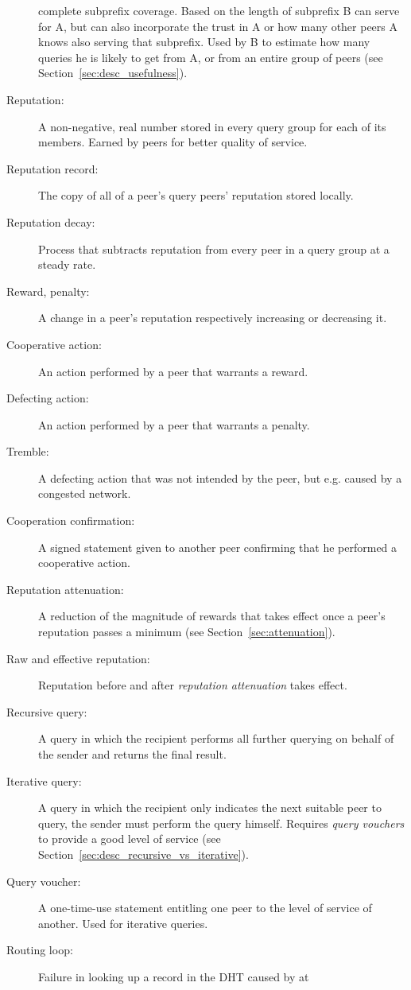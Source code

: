 \begin{description}
complete subprefix coverage. Based on the length of subprefix B can serve for A,
but can also incorporate the trust in A or how many other peers A knows also
serving that subprefix. Used by B to estimate how many queries he is likely to
get from A, or from an entire group of peers (see
Section~\ref{sec:desc_usefulness}).
\item[Reputation:] A non-negative, real number stored in every query group for
each of its members. Earned by peers for better quality of service.
\item[Reputation record:] The copy of all of a peer's query peers' reputation
stored locally.
\item[Reputation decay:] Process that subtracts reputation from every peer in a
query group at a steady rate.
\item[Reward, penalty:] A change in a peer's reputation respectively increasing
or decreasing it.
\item[Cooperative action:] An action performed by a peer that warrants a reward.
\item[Defecting action:] An action performed by a peer that warrants a penalty.
\item[Tremble:] A defecting action that was not intended by the peer, but e.g.
caused by a congested network.
\item[Cooperation confirmation:] A signed statement given to another peer
confirming that he performed a cooperative action.
\item[Reputation attenuation:] A reduction of the magnitude of rewards that
takes effect once a peer's reputation passes a minimum (see
Section~\ref{sec:attenuation}).
\item[Raw and effective reputation:] Reputation before and after
\emph{reputation attenuation} takes effect.
\item[Recursive query:] A query in which the recipient performs all further
querying on behalf of the sender and returns the final result.
\item[Iterative query:] A query in which the recipient only indicates the next
suitable peer to query, the sender must perform the query himself. Requires
\emph{query vouchers} to provide a good level of service (see
Section~\ref{sec:desc_recursive_vs_iterative}).
\item[Query voucher:] A one-time-use statement entitling one peer to the level
of service of another. Used for iterative queries.
\item[Routing loop:] Failure in looking up a record in the DHT caused by at

\end{description}
